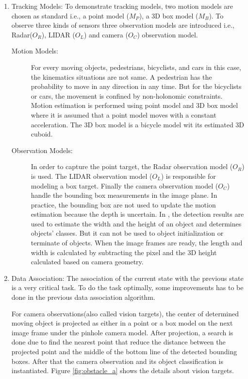 \begin{enumerate}[label=\Alph*]
    \item Tracking Models: To demonstrate tracking models, two motion models are chosen as standard i.e., a point model ($M_{P}$), a 3D box model ($M_{B}$). To observe three kinds of sensors three observation models are introduced i.e., Radar($O_{R}$), LIDAR ($O_{L}$) and camera ($O_{C}$) observation model.
    \begin{description}
        \item[Motion Models:] For every moving objects, pedestrians, bicyclists, and cars in this case, the kinematics situations are not same. A pedestrian has the probability to move in any direction in any time. But for the bicyclists or cars, the movement is confined by non-holonomic constraints\cite{Cho_2014}. Motion estimation is performed using point model and 3D box model where it is assumed that a point model moves with a constant acceleration\cite{Cho_2014}. The 3D box model is a bicycle model wit its estimated 3D cuboid\cite{Cho_2014}.
        \item[Observation Models:] In order to capture the point target, the Radar observation model ($O_{R}$) is used. The LIDAR observation model ($O_{L}$) is responsible for modeling a box target. Finally the camera observation model ($O_{C}$) handle the bounding box measurements in the image plane. In practice, the bounding box are not used to update the motion estimation because the depth is uncertain. In \cite{Cho_2014}, the detection results are used to estimate the width and the height of an object and determines objects’ classes. But it can not be used to object initialization or terminate of objects. When the image frames are ready, the length and width is calculated by subtracting the pixel and the 3D height calculated based on camera geometry.
    \end{description}
    \item Data Association: The association of the current state with the previous state is a very critical task. To do the task optimally, some improvements has to be done in the  previous data association algorithm\cite{Cho_2014}.
    
    For camera observations(also called vision targets), the center of determined moving object is projected as either in a point or a box model on the next image frame under the pinhole camera model. After projection, a search is done due to find the nearest point that reduce the distance between the projected point and the middle of the bottom line of the detected bounding boxes. After that the camera observation and its object classification is instantiated. Figure \ref{fig:obstacle_a} shows the details about vision targets.
    

\end{enumerate}

